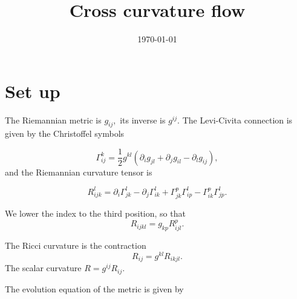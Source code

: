 \documentclass{amsart}
\theoremstyle{definition}
\theoremstyle{remark}
\numberwithin{equation}{section}
\begin{document}
\title[Cross curvature flow]
 {Cross curvature flow}

\curraddr{}
\email{}
\date{\today}

\dedicatory{}
\subjclass[2010]{}
\keywords{}

\begin{abstract}


\end{abstract}

\maketitle

\section{Set up}
The Riemannian metric is $g_{ij},$ its inverse is $g^{ij}$. The Levi-Civita connection is given by the Christoffel symbols


\begin{equation}
\Gamma_{ij}^k=\frac{1}{2}g^{kl}\left(\partial_ig_{jl}+\partial_jg_{il}-\partial_lg_{ij}\right),
\end{equation}
and the Riemannian curvature tensor is

\begin{equation}
R_{ijk}^l=\partial_i\Gamma_{jk}^l-\partial_j\Gamma_{ik}^l+\Gamma_{jk}^p\Gamma_{ip}^l-\Gamma_{ik}^p\Gamma_{jp}^l.
\end{equation}

We lower the index to the third position, so that
\begin{equation}
R_{ijkl}=g_{kp}R_{ijl}^p.
\end{equation}

The Ricci curvature is the contraction
\begin{equation}
R_{ij}=g^{kl}R_{ikjl}.
\end{equation}
The scalar curvature $R=g^{ij}R_{ij}.$

The evolution equation of the metric is given by
\end{document}
